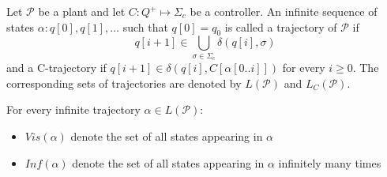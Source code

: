 \documentclass[table]{beamer}
\newcommand{\Controller}{\ensuremath{C:Q^+\longmapsto \Sigma_c}}
\begin{document}
\begin{frame}
	\begin{dfn}[Trajectories]
		Let $\mathcal{P}$ be a plant and let $\Controller$ be a controller. 
		An infinite sequence of states $\alpha:q[0],q[1],\ldots$ such that
		 $q[0]=q_0$ is called a trajectory of $\mathcal{P}$ if 
		$$q[i+1] \in \bigcup_{\sigma \in \Sigma_c}\delta(q[i],\sigma)$$
		and a C-trajectory if $q[i+1] \in \delta(q[i],C[\alpha[0..i]])$ for every $i\geq 0$.
		The corresponding sets of trajectories are denoted by $L(\mathcal{P})$ and $L_C(\mathcal{P})$.
	\end{dfn}
\end{frame}

\begin{frame}
	For every infinite trajectory $\alpha \in L(\mathcal{P})$:
	\begin{itemize}
		\item $Vis(\alpha)$ denote the set of all states appearing in $\alpha$
		\item $Inf(\alpha)$ denote the set of all states appearing in $\alpha$ infinitely many times
	\end{itemize}
\end{frame}
\end{document}
